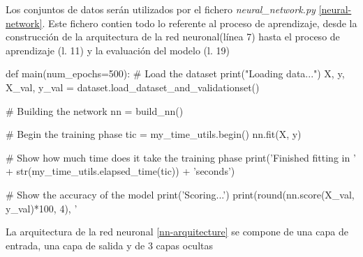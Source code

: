 Los conjuntos de datos serán utilizados por el fichero \textit{neural\_network.py} \ref{neural-network}. Este
fichero contien todo lo referente al proceso de aprendizaje, desde la construcción de la arquitectura de la red neuronal(línea 7) hasta el proceso de aprendizaje (l. 11) y la evaluación del modelo (l. 19)

\begin{python}[frame=none, numbers=left, label={neural-network},
caption={Declaración, aprendizaje y evaluación de la red neuronal}]
def main(num_epochs=500):
    # Load the dataset
    print("Loading data...")
    X, y, X_val, y_val = dataset.load_dataset_and_validationset()

    # Building the network
    nn = build_nn()

    # Begin the training phase
    tic = my_time_utils.begin()
    nn.fit(X, y)

    # Show how much time does it take the training phase
    print('Finished fitting in '
          + str(my_time_utils.elapsed_time(tic)) + 'seconds\n')

    # Show the accuracy of the model
    print('Scoring...')
    print(round(nn.score(X_val, y_val)*100, 4), '%

\end{python}

La arquitectura de la red neuronal \ref{nn-arquitecture} se compone de una capa de entrada, una capa de salida y de 3 capas ocultas

